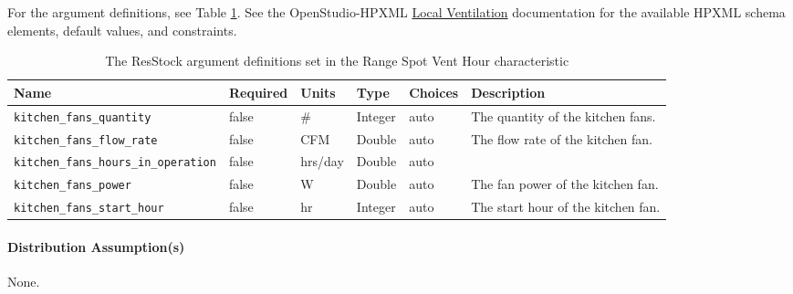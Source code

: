For the argument definitions, see Table \ref{table:hc_arg_def_range_fan}. See the OpenStudio-HPXML \href{https://openstudio-hpxml.readthedocs.io/en/v1.8.1/workflow_inputs.html#hpxml-local-ventilation-fans}{Local Ventilation} documentation for the available HPXML schema elements, default values, and constraints.

\begin{longtable}[]{|p{3.5cm}|p{1.5cm}|p{1.3cm}|p{1.1cm}|p{}|p{3.3cm}|} \caption{The ResStock argument definitions set in the Range Spot Vent Hour characteristic} \label{table:hc_arg_def_range_fan}\\
\toprule\noalign{}
Name & Required & Units & Type & Choices & Description \\
\midrule\noalign{}
\endhead
\bottomrule\noalign{}
\endlastfoot
\texttt{kitchen\_fans\_quantity} & false & \# & Integer & auto & The
quantity of the kitchen fans.  \\
\texttt{kitchen\_fans\_flow\_rate} & false & CFM & Double & auto & The
flow rate of the kitchen fan.  \\
\texttt{kitchen\_fans\_hours\_in\_operation} & false & hrs/day & Double
& auto &  \\
\texttt{kitchen\_fans\_power} & false & W & Double & auto & The fan
power of the kitchen fan. \\
\texttt{kitchen\_fans\_start\_hour} & false & hr & Integer & auto & The
start hour of the kitchen fan.  \\
\end{longtable}

\paragraph{Distribution Assumption(s)}
None.
